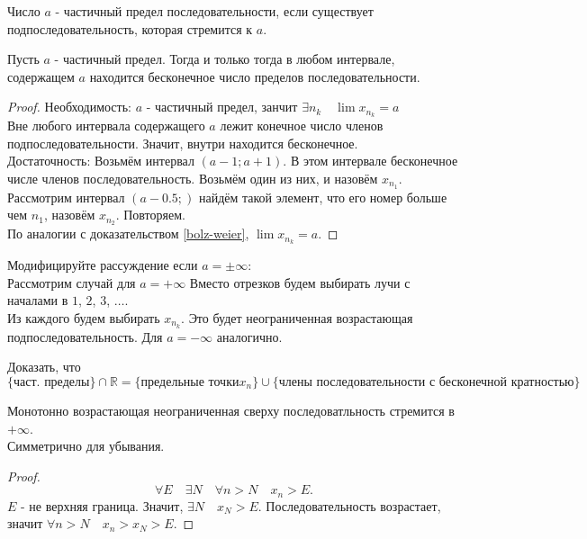 \documentclass[11pt, oneside]{article}   	%
\begin{document}
    \begin{definition}
        Число $a$ - частичный предел последовательности, если существует подпоследовательность, которая стремится к $a$.\\
    \end{definition}
    \begin{theorem}
        Пусть $a$ - частичный предел. Тогда и только тогда в любом интервале, содержащем $a$ находится бесконечное число пределов последовательности.
        \begin{proof}
            Необходимость:
                $a$ - частичный предел, занчит $\exists{n_k}\quad \lim x_{n_k} = a$\\
                Вне любого интервала содержащего $a$ лежит конечное число членов подпоследовательности. Значит, внутри находится бесконечное.\\
            Достаточность:
            Возьмём интервал $\left( a-1; a+1 \right) $. В этом интервале бесконечное числе членов последовательность. Возьмём один из них, и назовём $x_{n_1}$.\\
            Рассмотрим интервал $\left( a-0.5; \right) $ найдём такой элемент, что его номер больше чем $n_1$, назовём $x_{n_2}$. Повторяем.\\
        По аналогии с доказательством \ref{bolz-weier}, $\lim x_{n_k} = a$.
        \end{proof}
        \begin{problem}
            Модифицируйте рассуждение если $a=\pm\infty$:\\
            Рассмотрим случай для $a=+\infty$
            Вместо отрезков будем выбирать лучи с началами в $1$,  $2$,  $3$,  $\ldots$.\\
            Из каждого будем выбирать $x_{n_k}$. Это будет неограниченная возрастающая подпоследовательность. Для $a=-\infty$ аналогично.
        \end{problem}
        \begin{problem}
            Доказать, что 
            \[\{\text{част. пределы}\}\cap \mathbb{R} = \{\text{предельные точки} x_n\} \cup \{\text{члены последовательности с бесконечной кратностью}\}\]
        \end{problem}
    \end{theorem}
    \begin{tlemma}\label{monolim}
        Монотонно возрастающая неограниченная сверху последоватльность стремится в $+\infty$.\\
        Симметрично для убывания.\\
        \begin{proof}
            \[ \forall{E}\quad \exists{N}\quad \forall{n>N}\quad x_n>E .\]
            $E$ - не верхняя граница. Значит, $\exists{N}\quad x_N > E$. Последовательность возрастает, значит $\forall{n > N}\quad x_n > x_N > E$. 
        \end{proof}
    \end{tlemma}
\end{document}
